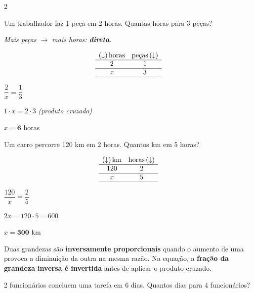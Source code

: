 \documentclass[12pt]{article}
\begin{document}
\begin{multicols}{2}

Um trabalhador faz 1 peça em 2 horas. Quantas horas para 3 peças?

\textit{Mais peças $\rightarrow$ mais horas: \textbf{direta}.}

$$\begin{array}{cc}
(\downarrow)\,\text{horas} & \text{peças}\,(\downarrow) \\ \hline
2 & 1 \\ \hline
\textcolor{iris}{x} & 3 \\ \hline
\end{array}$$

\vspace{0.2cm}

$\dfrac{2}{x} = \dfrac{1}{3}$ \vspace{6px}

$1 \cdot x = 2 \cdot 3$ \hfill {\small\textit{(produto cruzado)}} \vspace{6px}

$x = \textbf{6}$ horas


Um carro percorre 120 km em 2 horas. Quantos km em 5 horas?

$$\begin{array}{cc}
(\downarrow)\,\text{km} & \text{horas}\,(\downarrow) \\ \hline
120 & 2 \\ \hline
\textcolor{iris}{x} & 5 \\ \hline
\end{array}$$

\vspace{0.2cm}

$\dfrac{120}{x} = \dfrac{2}{5}$ \vspace{6px}

$2x = 120 \cdot 5 = 600$ \vspace{6px}

$x = \textbf{300}$ km


Duas grandezas são \textbf{inversamente proporcionais} quando o aumento de uma provoca a diminuição da outra na mesma razão. Na equação, a \textbf{fração da grandeza inversa é invertida} antes de aplicar o produto cruzado.


2 funcionários concluem uma tarefa em 6 dias. Quantos dias para 4 funcionários?


\end{multicols}
\end{document}

